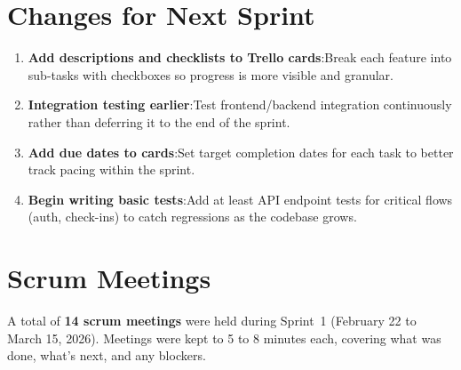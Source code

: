\documentclass[11pt]{article}
\begin{document}
\section{Changes for Next Sprint}

\begin{enumerate}[leftmargin=1.5em]
    \item \textbf{Add descriptions and checklists to Trello cards}:Break each feature into sub-tasks with checkboxes so progress is more visible and granular.

    \item \textbf{Integration testing earlier}:Test frontend/backend integration continuously rather than deferring it to the end of the sprint.

    \item \textbf{Add due dates to cards}:Set target completion dates for each task to better track pacing within the sprint.

    \item \textbf{Begin writing basic tests}:Add at least API endpoint tests for critical flows (auth, check-ins) to catch regressions as the codebase grows.
\end{enumerate}

\section{Scrum Meetings}

A total of \textbf{14 scrum meetings} were held during Sprint~1 (February 22 to March 15, 2026). Meetings were kept to 5 to 8 minutes each, covering what was done, what's next, and any blockers.
\end{document}

